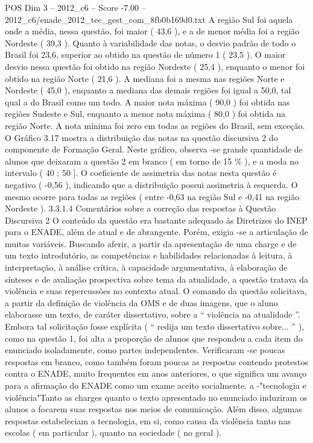 \begin{textsample}{POS Dim 3 – 2012\_c6 – Score -7.00 – 2012\_c6/enade\_2012\_tec\_gest\_com\_8fb0b169d0.txt}
A região Sul foi aquela onde a média, nessa questão, foi maior ( 43,6 ), e a de menor média foi a região Nordeste ( 39,3 ).
Quanto à variabilidade das notas, o desvio padrão de todo o Brasil foi 23,6, superior ao obtido na questão de número 1 ( 23,5 ).
O maior desvio nessa questão foi obtido na região Nordeste ( 25,4 ), enquanto o menor foi obtido na região Norte ( 21,6 ).
A mediana foi a mesma nas regiões Norte e Nordeste ( 45,0 ), enquanto a mediana das demais regiões foi igual a 50,0, tal qual a do Brasil como um todo.
A maior nota máxima ( 90,0 ) foi obtida nas regiões Sudeste e Sul, enquanto a menor nota máxima ( 80,0 ) foi obtida na região Norte.
A nota mínima foi zero em todas as regiões do Brasil, sem exceção.
O Gráfico 3.17 mostra a distribuição das notas na questão discursiva 2 do componente de Formação Geral.
Neste gráfico, observa -se grande quantidade de alunos que deixaram a questão 2 em branco ( em torno de 15 \% ), e a moda no intervalo ( 40 ; 50 ].
O coeficiente de assimetria das notas nesta questão é negativo ( -0,56 ), indicando que a distribuição possui assimetria à esquerda.
O mesmo ocorre para todas as regiões ( entre -0,63 na região Sul e -0,41 na região Nordeste ). 3.3.1.4 Comentários sobre a correção das respostas à Questão Discursiva 2 O conteúdo da questão era bastante adequado às Diretrizes do INEP para o ENADE, além de atual e de abrangente.
Porém, exigia -se a articulação de muitas variáveis.
Buscando aferir, a partir da apresentação de uma charge e de um texto introdutório, as competências e habilidades relacionadas à leitura, à interpretação, à análise crítica, à capacidade argumentativa, à elaboração de sínteses e de avaliação prospectiva sobre tema da atualidade, a questão tratava da violência e suas repercussões no contexto atual.
O comando da questão solicitava, a partir da definição de violência da OMS e de duas imagens, que o aluno elaborasse um texto, de caráter dissertativo, sobre a “ violência na atualidade ”.
Embora tal solicitação fosse explícita ( “ redija um texto dissertativo sobre... ” ), como na questão 1, foi alta a proporção de alunos que respondeu a cada item do enunciado isoladamente, como partes independentes.
Verificaram -se poucas respostas em branco, como também foram poucas as respostas contendo protestos contra o ENADE, muito frequentes em anos anteriores, o que significa um avanço para a afirmação do ENADE como um exame aceito socialmente. a -"tecnologia e violência"Tanto as charges quanto o texto apresentado no enunciado induziram os alunos a focarem suas respostas nos meios de comunicação.
Além disso, algumas respostas estabeleciam a tecnologia, em si, como causa da violência tanto nas escolas ( em particular ), quanto na sociedade ( no geral ).

\end{textsample}
